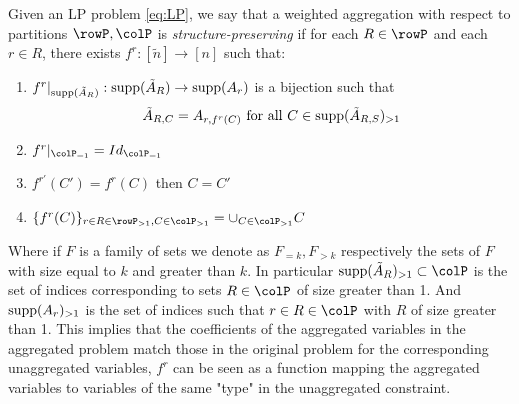 { \begin{definition}
  Given an LP problem \eqref{eq:LP}, we say that a weighted aggregation with respect to partitions \(\rowP, \colP\) is \emph{structure-preserving} if for each \(R \in \rowP\) and each \(r \in R\), there exists \(f^r: [\tilde{n}] \to [n]\)  such that:
  \begin{enumerate}
    \item \(f^r|_{\operatorname{supp}(\tilde{A}_{R})}: \operatorname{supp}(\tilde{A}_{R}) \to \operatorname{supp}(A_{r})\) is a bijection such that
    \[\tilde{A}_{R,C} = A_{r,f^r(C)} \text{ for all } C \in \operatorname{supp}(\tilde{A}_{R,S})_{>1}\]
    \item \(f^r|_{\colP_{=1}} = Id_{\colP_{=1}}\)
    \item \(f^{r'}(C') = f^r(C)\) then \( C=C'\)
    \item \(\{f^r(C)\}_{r\in R \in \rowP_{>1}, C \in \colP_{>1}} = \cup_{C \in \colP_{>1}}C\)
  \end{enumerate}
  \end{definition}

Where if \(F\) is a family of sets we denote as \(F_{=k}, F_{>k}\) respectively the sets of \(F\) with size equal to \(k\) and greater than \(k\).
In particular \(\supp(\tilde{A}_R)_{>1} \subset \colP\) is the set of indices corresponding to sets \(R \in \colP\) of size greater than 1. And \(\operatorname{supp}(A_r)_{>1}\) is the set of indices such that \(r \in R \in \colP\) with \(R\) of size greater than 1.
This implies that the coefficients of the aggregated variables in the aggregated problem match those in the original problem for the corresponding unaggregated variables, \(f^r\) can be seen as a function mapping the aggregated variables to variables of the same "type" in the unaggregated constraint.
 


}
